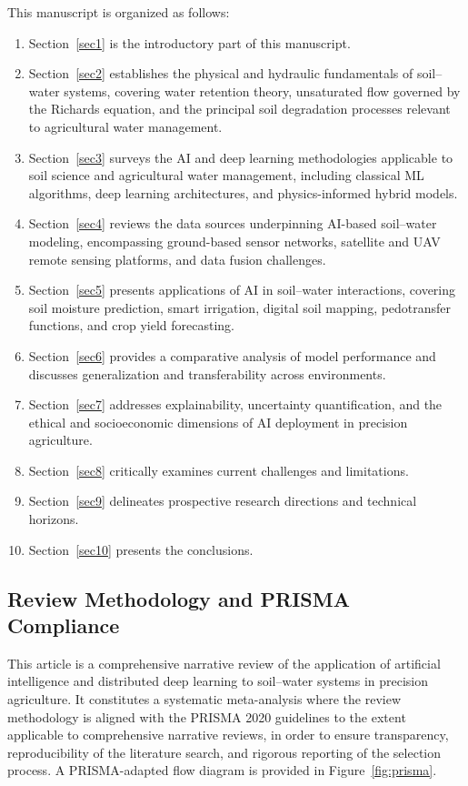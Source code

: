 \documentclass[land,review,accept,pdftex,oneauthor]{Definitions/mdpi}
\begin{document}
{This manuscript is organized as follows: 
\begin{enumerate}[label=(\roman*)]
\item Section~\ref{sec1} is the introductory part of this manuscript.
\item Section~\ref{sec2} establishes the physical and hydraulic fundamentals of soil--water systems, covering water retention theory, unsaturated flow governed by the Richards equation, and the principal soil degradation processes relevant to agricultural water management. 
\item Section~\ref{sec3} surveys the AI and deep learning methodologies applicable to soil science and agricultural water management, including classical ML algorithms, deep learning architectures, and physics-informed hybrid models. 
\item Section~\ref{sec4} reviews the data sources underpinning AI-based soil--water modeling, encompassing ground-based sensor networks, satellite and UAV remote sensing platforms, and data fusion challenges. \item Section~\ref{sec5} presents applications of AI in soil--water interactions, covering soil moisture prediction, smart irrigation, digital soil mapping, pedotransfer functions, and crop yield forecasting. 
\item Section~\ref{sec6} provides a comparative analysis of model performance and discusses generalization and transferability across environments. 
\item Section~\ref{sec7} addresses explainability, uncertainty quantification, and the ethical and socioeconomic dimensions of AI deployment in precision agriculture. 
\item Section~\ref{sec8} critically examines current challenges and limitations.
\item Section~\ref{sec9} delineates prospective research directions and technical horizons. 
\item Section~\ref{sec10} presents the conclusions.
\end{enumerate}}

\subsection{{Review Methodology and PRISMA Compliance}}

{This article is a comprehensive narrative review of the application of artificial intelligence and distributed deep learning to soil--water systems in precision agriculture. It constitutes a systematic meta-analysis where the review methodology is aligned with the PRISMA 2020 guidelines \citep{regulation2016eu} to the extent applicable to comprehensive narrative reviews, in order to ensure transparency, reproducibility of the literature search, and rigorous reporting of the selection process. A PRISMA-adapted flow diagram is provided in Figure~\ref{fig:prisma}.}
\end{document}
